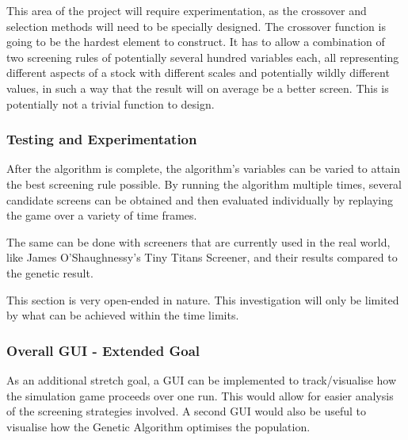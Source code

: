 This area of the project will require experimentation, as the crossover and selection methods will need to be specially designed. The crossover function is going to be the hardest element to construct. It has to allow a combination of two screening rules of potentially several hundred variables each, all representing different aspects of a stock with different scales and potentially wildly different values, in such a way that the result will on average be a better screen. This is potentially not a trivial function to design.

\subsubsection{Testing and Experimentation}
After the algorithm is complete, the algorithm’s variables can be varied to attain the best screening rule possible. By running the algorithm multiple times, several candidate screens can be obtained and then evaluated individually by replaying the game over a variety of time frames. \newline

The same can be done with screeners that are currently used in the real world, like James O'Shaughnessy’s Tiny Titans Screener, and their results compared to the genetic result. \newline

This section is very open-ended in nature. This investigation will only be limited by what can be achieved within the time limits.

\subsubsection{Overall GUI - Extended Goal}
As an additional stretch goal, a GUI can be implemented to track/visualise how the simulation game proceeds over one run. This would allow for easier analysis of the screening strategies involved. A second GUI would also be useful to visualise how the Genetic Algorithm optimises the population.


